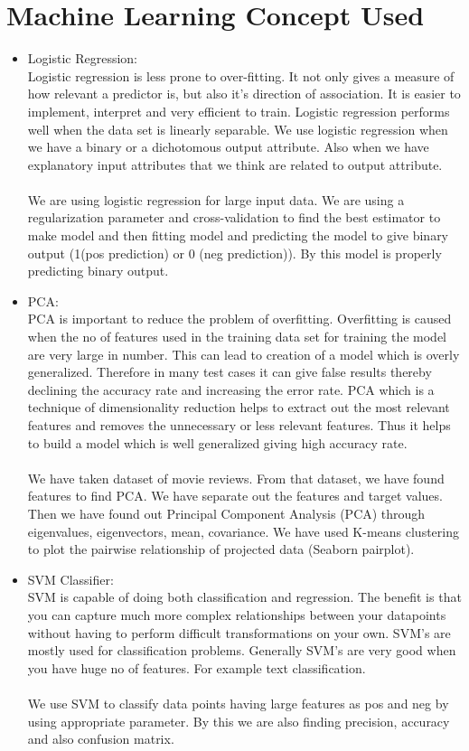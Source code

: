 \documentclass{article}
\begin{document}
\section {Machine Learning Concept Used}
\begin{itemize}
    \item Logistic Regression: \\
    Logistic regression is less prone to over-fitting. It not only gives a measure of how relevant a predictor is, but also it's direction of association. It is easier to implement, interpret and very efficient to train. Logistic regression performs well when the data set is linearly separable. We use logistic regression when we have a binary or a dichotomous output attribute. Also when we have explanatory input attributes that we think are related to output attribute.
    \\ \\We are using logistic regression for large input data. We are using a regularization parameter and cross-validation to find the best estimator to make model and then fitting model and predicting the model to give binary  output (1(pos prediction) or 0 (neg prediction)). By this model is properly predicting binary output.
    
    \item PCA: \\
    PCA is important to reduce the problem of overfitting. Overfitting is caused when the no of features used in the training data set for training the model are very large in number. This can lead to creation of a model which is overly generalized. Therefore in many test cases it can give false results thereby declining the accuracy rate and increasing the error rate. PCA which is a technique of dimensionality  reduction helps to extract out the most relevant features and removes the unnecessary or less relevant features. Thus it helps to build a model which is well generalized giving high accuracy rate.
    \\ \\We have taken dataset of movie reviews. From that dataset, we have found features to find PCA. We have separate out the features and target values. Then we have found out Principal Component Analysis (PCA) through eigenvalues, eigenvectors, mean, covariance. We have used K-means clustering to plot the pairwise relationship of projected data (Seaborn pairplot).
    
    \item SVM Classifier:
    \\SVM is capable of doing both classification and regression. The benefit is that you can capture much more complex relationships between your datapoints without having to perform difficult transformations on your own. SVM's are mostly used for classification problems. Generally SVM's are very good when you have huge no of features. For example text classification.
    \\ \\We use SVM to classify data points having large features as pos and neg by using appropriate parameter. By this we are also finding precision, accuracy and also confusion matrix.
\end{itemize}
\end{document}
